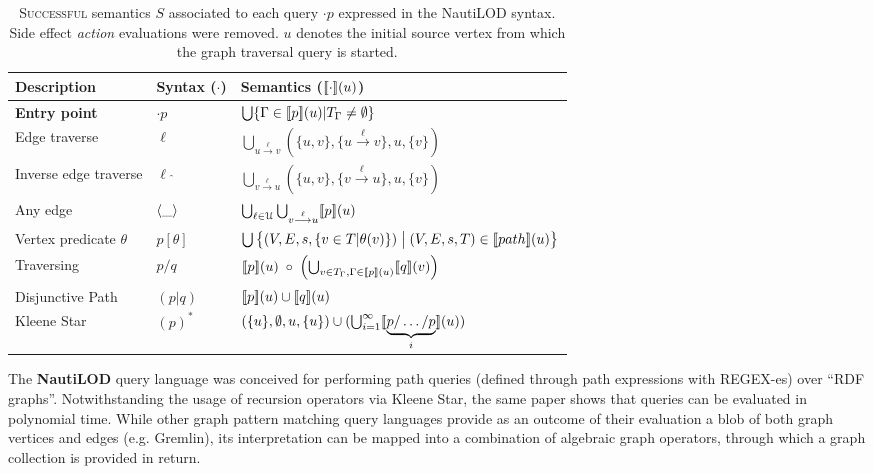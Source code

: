 \begin{table}
	\centering
	\begin{tabular}{l|ll}
		\toprule
		 Description & Syntax ($\cdot$) & Semantics ($[\! [\cdot]\!](u)$)\\
		\midrule
		\textbf{Entry point} & $\cdot p$ & $\bigcup\{\Gamma\in [\! [{p}]\!](u)|T_\Gamma\neq \emptyset\}$\\
		\midrule
		Edge traverse & $\ell$ & $\bigcup_{u\overset{\ell}{\longrightarrow}v}(\{u,v\},\{u\overset{\ell}{\longrightarrow}v\},u,\{v\})$\\
		Inverse edge traverse & $\ell\;\hat{}$ & $\bigcup_{v\overset{\ell}{\longrightarrow}u}(\{u,v\},\{v\overset{\ell}{\longrightarrow}u\},u,\{v\})$\\
		Any edge & $\Braket{\_}$ & $\bigcup_{\ell\in \mathcal{U}}\bigcup_{v\overset{\ell}{\longrightarrow}u} [\! [p]\!](u)$\\
		Vertex predicate $\theta$ & $p[\theta]$ & $\bigcup\big\{(V,E,s,\{v\in T|\theta(v)\})\;\big|\;(V,E,s,T)\in [\! [path]\!](u)\big\}$\\
		Traversing & $p/q$ &  $[\! [p]\!](u)\;\circ\;\left(\bigcup_{v\in T_\Gamma,\Gamma\in [\! [p]\!](u)} [\! [q]\!](v)\right)$\\
		Disjunctive Path & $(p|q)$ & $[\! [p]\!](u)\cup[\! [q]\!](u)$\\
		Kleene Star & $(p)^*$ & $(\{u\},\emptyset,u,\{u\})\cup(\bigcup_{i=1}^\infty [\! [\underbrace{p/\dots/p}_i]\!](u))$\\
		\bottomrule
	\end{tabular}
	\caption{\textsc{Successful} semantics $S$ associated to each query $\cdot p$ expressed in the NautiLOD syntax. Side effect \textit{action} evaluations were removed. $u$ denotes the initial source vertex from which the graph traversal query is started.
	}
	\label{tab:nautilodSem}
\end{table}


The \textbf{NautiLOD} \cite{NautiLOD} query language was conceived for performing path queries (defined through
path expressions with REGEX-es) over
``RDF graphs''. Notwithstanding the usage of recursion operators via Kleene Star, the same paper shows  that queries can be evaluated in polynomial time.
While other graph pattern matching query languages provide as an outcome of their evaluation a blob of both graph vertices and edges (e.g. Gremlin), its interpretation can be mapped into a combination of algebraic graph operators, through which a graph collection is provided in return.  %


